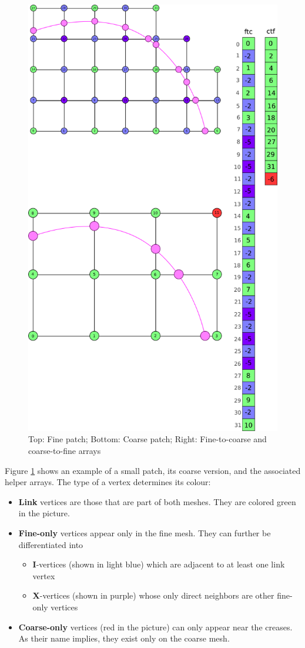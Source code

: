 \documentclass[a4paper,twoside,12pt,nochapterprefix]{scrbook}
\begin{document}
\begin{figure}
    \centering
    \includegraphics[width=0.7\linewidth]{figures/0213_ftc_ctf}
    \caption{Top: Fine patch; Bottom: Coarse patch; Right: Fine-to-coarse and coarse-to-fine arrays
      \label{fig:ftc_ctf}}
\end{figure}
Figure \ref{fig:ftc_ctf} shows an example of a small patch, its coarse version, and the associated helper arrays. The type of a vertex determines its colour:\newline
\begin{itemize}
\item \textbf{Link} vertices are those that are part of both meshes. They are colored green in the picture.
\item \textbf{Fine-only} vertices appear only in the fine mesh. They can further be differentiated into
\begin{itemize}
\item \textbf{I}-vertices (shown in light blue) which are adjacent to at least one link vertex
\item \textbf{X}-vertices (shown in purple) whose only direct neighbors are other fine-only vertices
\end{itemize}
\item \textbf{Coarse-only} vertices (red in the picture) can only appear near the creases. As their name implies, they exist only on the coarse mesh.
\end{itemize}
\end{document}
